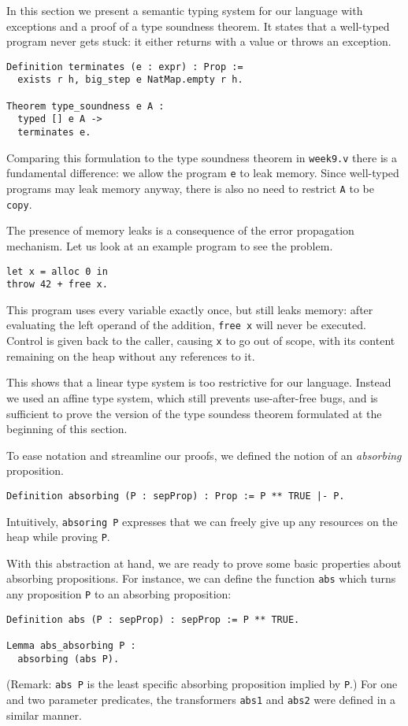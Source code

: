 \documentclass{article}
\begin{document}
In this section we present a semantic typing system for our language with exceptions and a proof of a type soundness theorem. It states that
a well-typed program never gets stuck: it either returns with a value or throws an exception.
\begin{lstlisting}
Definition terminates (e : expr) : Prop :=
  exists r h, big_step e NatMap.empty r h.

Theorem type_soundness e A :
  typed [] e A ->
  terminates e.
\end{lstlisting}
Comparing this formulation to the type soundness theorem in \texttt{week9.v} there is a fundamental difference: we allow the program \texttt{e} to leak
memory. Since well-typed programs may leak memory anyway, there is also no need to restrict \texttt{A} to be \texttt{copy}.

The presence of memory leaks is a consequence of the error propagation mechanism. Let us look at an example program to see the problem.
\begin{lstlisting}
let x = alloc 0 in
throw 42 + free x.
\end{lstlisting}
This program uses every variable exactly once, but still leaks memory: after evaluating the left operand of the addition, \texttt{free x} will never be executed.
Control is given back to the caller, causing \texttt{x} to go out of scope, with its content remaining on the heap without any references to it.

This shows that a linear type system is too restrictive for our language. Instead we used an affine type system, which still prevents use-after-free bugs, and
is sufficient to prove the version of the type soundess theorem formulated at the beginning of this section.

To ease notation and streamline our proofs, we defined the notion of an \textit{absorbing} proposition.
\begin{lstlisting}
Definition absorbing (P : sepProp) : Prop := P ** TRUE |- P.
\end{lstlisting}
Intuitively, \texttt{absoring P} expresses that we can freely give up any resources on the heap while proving \texttt{P}.

With this abstraction at hand, we are ready to prove some basic properties about absorbing propositions. For instance, we can define
the function \texttt{abs} which turns any proposition \texttt{P} to an absorbing proposition:
\begin{lstlisting}
Definition abs (P : sepProp) : sepProp := P ** TRUE.

Lemma abs_absorbing P :
  absorbing (abs P).
\end{lstlisting}
(Remark: \texttt{abs P} is the least specific absorbing proposition implied by \texttt{P}.)
For one and two parameter predicates, the transformers \texttt{abs1} and \texttt{abs2} were defined in a similar manner.
\end{document}
